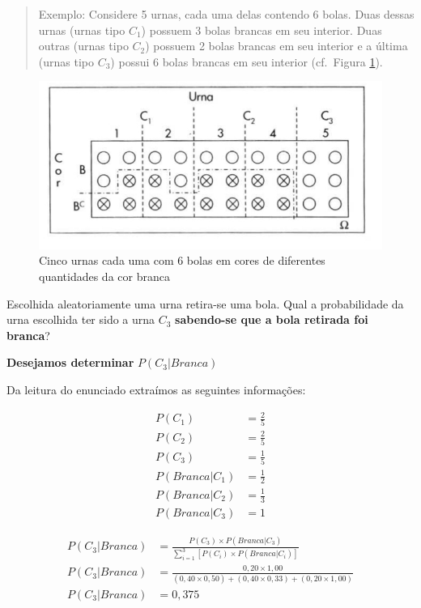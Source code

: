 \documentclass[
]{book}
\begin{document}
\begin{quote}
Exemplo: Considere 5 urnas, cada uma delas contendo 6 bolas. Duas dessas urnas (urnas tipo \(C_{1}\)) possuem 3 bolas brancas em seu interior. Duas outras (urnas tipo \(C_{2}\)) possuem 2 bolas brancas em seu interior e a última (urnas tipo \(C_{3}\)) possui 6 bolas brancas em seu interior (cf.~Figura \ref{fig:fig11}).
\end{quote}

\hfill\break

\begin{figure}

{\centering \includegraphics[width=0.5\linewidth]{images4/exemplo_02_bayes} 

}

\caption{Cinco urnas cada uma com 6 bolas em cores de diferentes quantidades da cor branca}\label{fig:fig11}
\end{figure}

\hfill\break

Escolhida aleatoriamente uma urna retira-se uma bola. Qual a probabilidade da urna escolhida ter sido a urna \(C_{3}\) \textbf{sabendo-se que a bola retirada foi branca}?

\hfill\break

\textbf{Desejamos determinar} \(P(C_{3} | Branca)\)

\hfill\break

Da leitura do enunciado extraímos as seguintes informações:

\hfill\break

\begin{align*}
P(C_{1}) & = \frac{2}{5} \\
P(C_{2}) & = \frac{2}{5} \\
P(C_{3}) & = \frac{1}{5} \\
P(Branca | C_{1}) & = \frac{1}{2} \\
P(Branca | C_{2}) & = \frac{1}{3} \\
P(Branca | C_{3}) & = 1
\end{align*}

\hfill\break

\begin{align*}
P(C_{3} | Branca) & = \frac{ P(C_{3}) \times P(Branca | C_{3})  }{  \sum_{i=1}^{3}\left[P\left({C}_{i}\right)\times P\left(Branca | {C}_{i}\right)\right]  } \\
P(C_{3} | Branca) & = \frac{ 0,20 \times 1,00} { (0,40  \times 0,50 ) + (0,40 \times 0,33 ) +(0,20 \times 1,00)} \\
P(C_{3} | Branca) & = 0,375
\end{align*}
\end{document}
